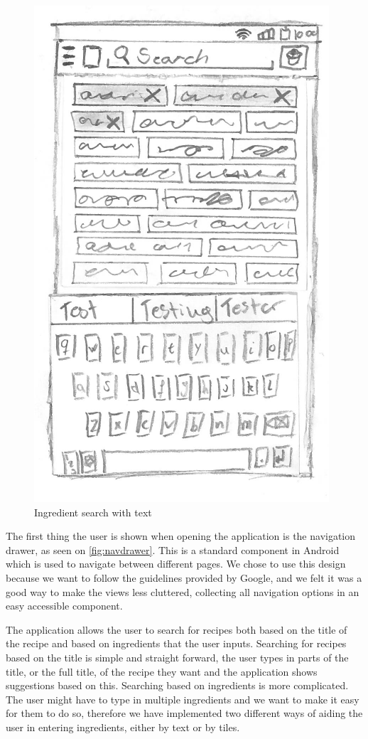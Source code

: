 \begin{figure}[H]
\begin{minipage}[b]{0.5\columnwidth}
\includegraphics[width=0.7\columnwidth]{img/prototypes/ingredient_search_text.pdf}
\caption{Ingredient search with text\label{fig:ingretext}}
\end{minipage}
\end{figure}

The first thing the user is shown when opening the application is the navigation drawer, as seen on \autoref{fig:navdrawer}. This is a standard component in Android which is used to navigate between different pages. We chose to use this design because we want to follow the guidelines provided by Google\cite{guidelines-appstructure}, and we felt it was a good way to make the views less cluttered, collecting all navigation options in an easy accessible component.

The application allows the user to search for recipes both based on the title of the recipe and based on ingredients that the user inputs. Searching for recipes based on the title is simple and straight forward, the user types in parts of the title, or the full title, of the recipe they want and the application shows suggestions based on this. Searching based on ingredients is more complicated. The user might have to type in multiple ingredients and we want to make it easy for them to do so, therefore we have implemented two different ways of aiding the user in entering ingredients, either by text or by tiles.

